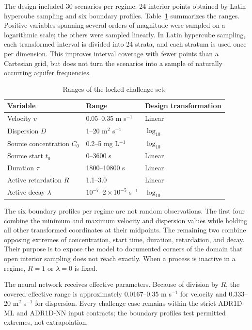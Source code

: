 \documentclass[11pt,a4paper]{article}
\begin{document}
The design included 30 scenarios per regime: 24 interior points obtained by
Latin hypercube sampling \cite{mckay1979} and six boundary profiles.
Table~\ref{tab:ranges} summarizes the ranges. Positive variables spanning
several orders of magnitude were sampled on a logarithmic scale; the others
were sampled linearly. In Latin hypercube sampling, each transformed interval
is divided into 24 strata, and each stratum is used once per dimension. This
improves interval coverage with fewer points than a Cartesian grid, but does
not turn the scenarios into a sample of naturally occurring aquifer
frequencies.

\begin{table}[htbp]
\centering
\caption{Ranges of the locked challenge set.}
\label{tab:ranges}
\begin{tabular}{@{}lll@{}}
\toprule
Variable & Range & Design transformation \\
\midrule
Velocity $v$ & 0.05--0.35 m s$^{-1}$ & Linear \\
Dispersion $D$ & 1--20 m$^2$ s$^{-1}$ & $\log_{10}$ \\
Source concentration $C_0$ & 0.2--5 mg L$^{-1}$ & $\log_{10}$ \\
Source start $t_0$ & 0--3600 s & Linear \\
Duration $\tau$ & 1800--10800 s & Linear \\
Active retardation $R$ & 1.1--3.0 & Linear \\
Active decay $\lambda$ & $10^{-7}$--$2\times10^{-5}$ s$^{-1}$ & $\log_{10}$ \\
\bottomrule
\end{tabular}
\end{table}

The six boundary profiles per regime are not random observations. The first
four combine the minimum and maximum velocity and dispersion values while
holding all other transformed coordinates at their midpoints. The remaining
two combine opposing extremes of concentration, start time, duration,
retardation, and decay. Their purpose is to expose the model to documented
corners of the domain that open interior sampling does not reach exactly. When
a process is inactive in a regime, $R=1$ or $\lambda=0$ is fixed.

The neural network receives effective parameters. Because of division by $R$,
the covered effective range is approximately 0.0167--0.35 m s$^{-1}$ for
velocity and 0.333--20 m$^2$ s$^{-1}$ for dispersion. Every challenge case
remains within the strict ADR1D-ML and ADR1D-NN input contracts; the boundary
profiles test permitted extremes, not extrapolation.
\end{document}
